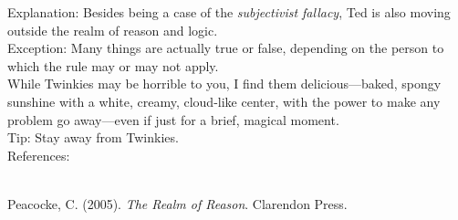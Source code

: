 \documentclass[a4paper,12pt,single,pdftex]{scrartcl}
\begin{document}
    
      Explanation: Besides being a case of the {\it subjectivist fallacy}, Ted is also moving outside the realm of reason and logic.
    \\

    
      Exception: Many things are actually true or false, depending on the person to which the rule may or may not apply.
    \\

    
      While Twinkies may be horrible to you, I find them delicious—baked, spongy sunshine with a white, creamy, cloud-like center, with the power to make any problem go away—even if just for a brief, magical moment.
    \\

    
      Tip: Stay away from Twinkies.
    \\

    References:

    
      
        
      \\

      
        
          Peacocke, C. (2005). {\it The Realm of Reason}. Clarendon Press.
        
      
    
  
\end{document}

